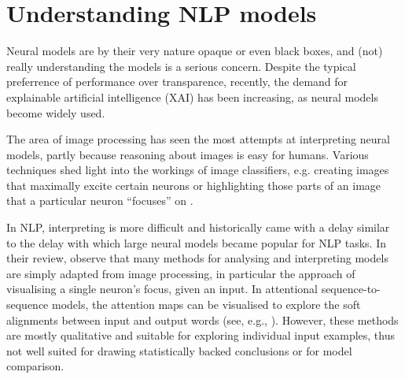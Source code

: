 \documentclass[bsc,frontabs,twoside,singlespacing,parskip,deptreport]{infthesis}
\begin{document}
{  \section{Understanding NLP models}{
    \label{sec:understanding-models}
    Neural models are by their very nature opaque or even black boxes, and (not) really understanding the models is a serious concern.
    Despite the typical preferrence of performance over transparence, recently, the demand for explainable artificial intelligence (XAI) has been increasing, as neural models become widely used.

    The area of image processing has seen the most attempts at interpreting neural models, partly because reasoning about images is easy for humans. Various techniques shed light into the workings of image classifiers, e.g. creating images that maximally excite certain neurons \citep{Simonyan_2013} or highlighting those parts of an image that a particular neuron ``focuses'' on \citep{Zeiler_2013}. 
    
    In NLP, interpreting is more difficult and historically came with a delay similar to the delay with which large neural models became popular for NLP tasks.
    In their review, \citet{Belinkov_2018} observe that many methods for analysing and interpreting models are simply adapted from image processing, in particular the approach of visualising a single neuron's focus, given an input.
    In attentional sequence-to-sequence models, the attention maps can be visualised to explore the soft alignments between input and output words (see, e.g., \citet{Strobelt_2018}). However, these methods are mostly qualitative and suitable for exploring individual input examples, thus not well suited for drawing statistically backed conclusions or for model comparison.
    
}}
\end{document}
